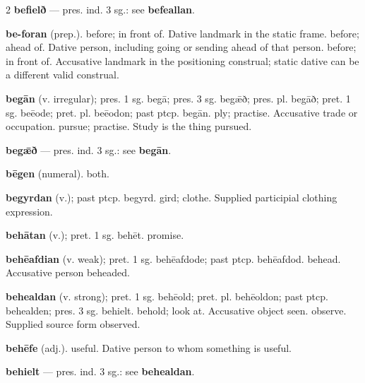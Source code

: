 \begin{multicols*}{2}
\textbf{befielð} — pres. ind. 3 sg.: see \textbf{befeallan}.\par
\textbf{be-foran} (prep.). before; in front of. Dative landmark in the static frame. before; ahead of. Dative person, including going or sending ahead of that person. before; in front of. Accusative landmark in the positioning construal; static dative can be a different valid construal.\par
\textbf{begān} (v. irregular); pres. 1 sg. begā; pres. 3 sg. begǣð; pres. pl. begāð; pret. 1 sg. beēode; pret. pl. beēodon; past ptcp. begān. ply; practise. Accusative trade or occupation. pursue; practise. Study is the thing pursued.\par
\textbf{begǣð} — pres. ind. 3 sg.: see \textbf{begān}.\par
\textbf{bēgen} (numeral). both.\par
\textbf{begyrdan} (v.); past ptcp. begyrd. gird; clothe. Supplied participial clothing expression.\par
\textbf{behātan} (v.); pret. 1 sg. behēt. promise.\par
\textbf{behēafdian} (v. weak); pret. 1 sg. behēafdode; past ptcp. behēafdod. behead. Accusative person beheaded.\par
\textbf{behealdan} (v. strong); pret. 1 sg. behēold; pret. pl. behēoldon; past ptcp. behealden; pres. 3 sg. behielt. behold; look at. Accusative object seen. observe. Supplied source form observed.\par
\textbf{behēfe} (adj.). useful. Dative person to whom something is useful.\par
\textbf{behielt} — pres. ind. 3 sg.: see \textbf{behealdan}.\par

\end{multicols*}
